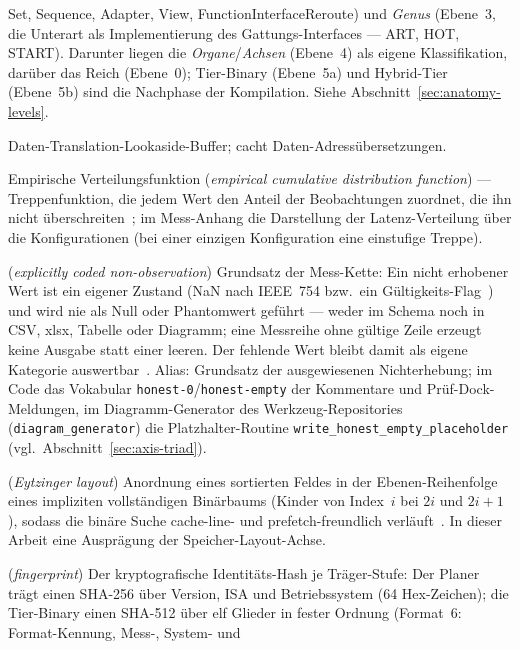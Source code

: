 \begin{description}
  Set, Sequence, Adapter, View, FunctionInterfaceReroute) und \emph{Genus} (Ebene~3, die Unterart als
  Implementierung des Gattungs-Interfaces --- ART, HOT, START). Darunter liegen die
  \emph{Organe}/\emph{Achsen} (Ebene~4) als eigene Klassifikation, darüber das Reich (Ebene~0);
  Tier-Binary (Ebene~5a) und Hybrid-Tier (Ebene~5b) sind die Nachphase der Kompilation. Siehe
  Abschnitt~\ref{sec:anatomy-levels}.
  \item[dTLB] Daten-Translation-Lookaside-Buffer; cacht Daten-Adressübersetzungen.
  \item[ECDF] Empirische Verteilungsfunktion (\emph{empirical cumulative distribution function})
  --- Treppenfunktion, die jedem Wert den Anteil der Beobachtungen zuordnet, die ihn nicht
  überschreiten~\cite{wilk1968probability}; im Mess-Anhang die Darstellung der Latenz-Verteilung
  über die Konfigurationen (bei einer einzigen Konfiguration eine einstufige Treppe).
  \item[Explizit kodierte Nicht-Erhebung] (\emph{explicitly coded non-observation}) Grundsatz der
  Mess-Kette: Ein nicht erhobener Wert ist ein eigener Zustand (NaN nach IEEE~754 bzw.\ ein
  Gültigkeits-Flag~\cite{ieee754_2019}) und wird nie als Null oder Phantomwert geführt --- weder im
  Schema noch in CSV, xlsx, Tabelle oder Diagramm; eine Messreihe ohne gültige Zeile erzeugt keine
  Ausgabe statt einer leeren. Der fehlende Wert bleibt damit als eigene Kategorie
  auswertbar~\cite{graham2009missing}. Alias: Grundsatz der ausgewiesenen Nichterhebung; im Code das
  Vokabular \texttt{honest-0}/\texttt{honest-empty} der Kommentare und Prüf-Dock-Meldungen, im
  Diagramm-Generator des Werkzeug-Repositories (\texttt{diagram\_generator}) die Platzhalter-Routine
  \texttt{write\_honest\_empty\_placeholder} (vgl.\ Abschnitt~\ref{sec:axis-triad}).
  \item[Eytzinger-Layout] (\emph{Eytzinger layout}) Anordnung eines sortierten Feldes in der
  Ebenen-Reihenfolge eines impliziten vollständigen Binärbaums (Kinder von Index~$i$ bei $2i$ und
  $2i+1$), sodass die binäre Suche cache-line- und prefetch-freundlich
  verläuft~\cite{khuong2017eytzinger}. In dieser Arbeit eine Ausprägung der Speicher-Layout-Achse.
  \item[Fingerprint] (\emph{fingerprint}) Der kryptografische Identitäts-Hash je Träger-Stufe: Der
  Planer trägt einen SHA-256 über Version, ISA und Betriebssystem (64 Hex-Zeichen); die Tier-Binary
  einen SHA-512 über elf Glieder in fester Ordnung (Format~6: Format-Kennung, Mess-, System- und

\end{description}
